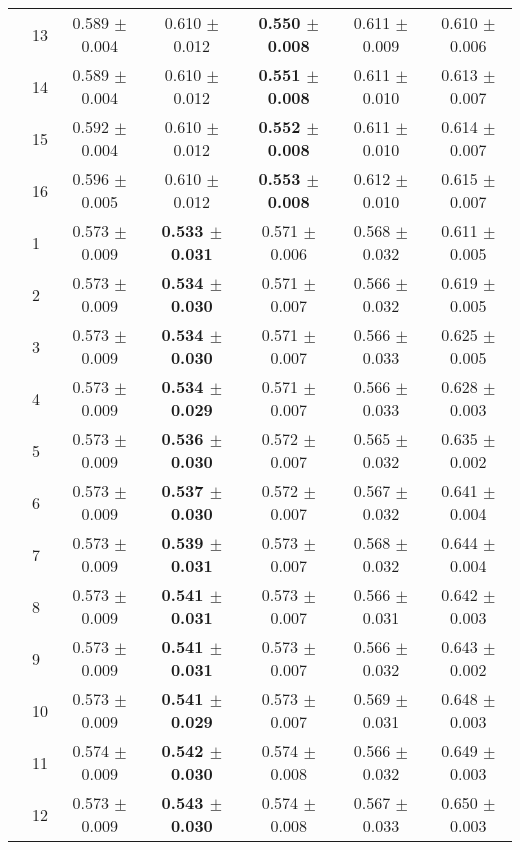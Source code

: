 \begin{table*}[t]
{\begin{tabular}{ll c c c c c}
        & 13 & 0.589 $\pm$ 0.004 & 0.610 $\pm$ 0.012 & \textbf{0.550 $\pm$ 0.008} & 0.611 $\pm$ 0.009 & 0.610 $\pm$ 0.006 \\
        & 14 & 0.589 $\pm$ 0.004 & 0.610 $\pm$ 0.012 & \textbf{0.551 $\pm$ 0.008} & 0.611 $\pm$ 0.010 & 0.613 $\pm$ 0.007 \\
        & 15 & 0.592 $\pm$ 0.004 & 0.610 $\pm$ 0.012 & \textbf{0.552 $\pm$ 0.008} & 0.611 $\pm$ 0.010 & 0.614 $\pm$ 0.007 \\
        & 16 & 0.596 $\pm$ 0.005 & 0.610 $\pm$ 0.012 & \textbf{0.553 $\pm$ 0.008} & 0.612 $\pm$ 0.010 & 0.615 $\pm$ 0.007 \\
\midrule
\assist{} & 1 & 0.573 $\pm$ 0.009 & \textbf{0.533 $\pm$ 0.031} & 0.571 $\pm$ 0.006 & 0.568 $\pm$ 0.032 & 0.611 $\pm$ 0.005 \\
        & 2 & 0.573 $\pm$ 0.009 & \textbf{0.534 $\pm$ 0.030} & 0.571 $\pm$ 0.007 & 0.566 $\pm$ 0.032 & 0.619 $\pm$ 0.005 \\
        & 3 & 0.573 $\pm$ 0.009 & \textbf{0.534 $\pm$ 0.030} & 0.571 $\pm$ 0.007 & 0.566 $\pm$ 0.033 & 0.625 $\pm$ 0.005 \\
        & 4 & 0.573 $\pm$ 0.009 & \textbf{0.534 $\pm$ 0.029} & 0.571 $\pm$ 0.007 & 0.566 $\pm$ 0.033 & 0.628 $\pm$ 0.003 \\
        & 5 & 0.573 $\pm$ 0.009 & \textbf{0.536 $\pm$ 0.030} & 0.572 $\pm$ 0.007 & 0.565 $\pm$ 0.032 & 0.635 $\pm$ 0.002 \\
        & 6 & 0.573 $\pm$ 0.009 & \textbf{0.537 $\pm$ 0.030} & 0.572 $\pm$ 0.007 & 0.567 $\pm$ 0.032 & 0.641 $\pm$ 0.004 \\
        & 7 & 0.573 $\pm$ 0.009 & \textbf{0.539 $\pm$ 0.031} & 0.573 $\pm$ 0.007 & 0.568 $\pm$ 0.032 & 0.644 $\pm$ 0.004 \\
        & 8 & 0.573 $\pm$ 0.009 & \textbf{0.541 $\pm$ 0.031} & 0.573 $\pm$ 0.007 & 0.566 $\pm$ 0.031 & 0.642 $\pm$ 0.003 \\
        & 9 & 0.573 $\pm$ 0.009 & \textbf{0.541 $\pm$ 0.031} & 0.573 $\pm$ 0.007 & 0.566 $\pm$ 0.032 & 0.643 $\pm$ 0.002 \\
        & 10 & 0.573 $\pm$ 0.009 & \textbf{0.541 $\pm$ 0.029} & 0.573 $\pm$ 0.007 & 0.569 $\pm$ 0.031 & 0.648 $\pm$ 0.003 \\
        & 11 & 0.574 $\pm$ 0.009 & \textbf{0.542 $\pm$ 0.030} & 0.574 $\pm$ 0.008 & 0.566 $\pm$ 0.032 & 0.649 $\pm$ 0.003 \\
        & 12 & 0.573 $\pm$ 0.009 & \textbf{0.543 $\pm$ 0.030} & 0.574 $\pm$ 0.008 & 0.567 $\pm$ 0.033 & 0.650 $\pm$ 0.003 \\

\end{tabular}}
\end{table*}
